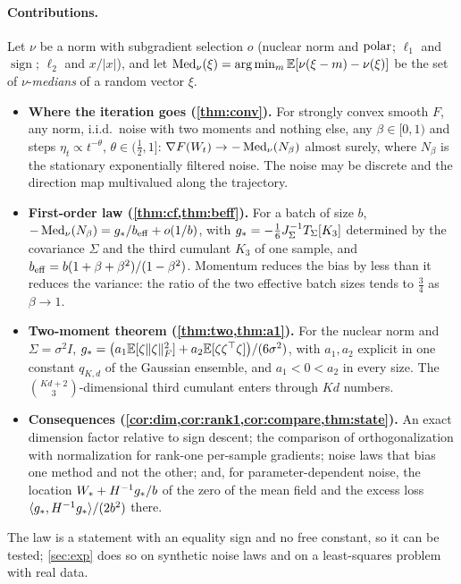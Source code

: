 \documentclass{article}
\theoremstyle{plain}
\theoremstyle{definition}
\theoremstyle{remark}
\begin{document}
\paragraph{Contributions.} Let $\nu$ be a norm with subgradient selection $o$ (nuclear norm and $\operatorname{polar}$; $\ell_1$ and
$\operatorname{sign}$; $\ell_2$ and $x/|x|$), and let $\operatorname{Med}_\nu(\xi)=\arg\min_m\mathbb{E}[\nu(\xi-m)-\nu(\xi)]$ be the set of
$\nu$-\emph{medians} of a random vector $\xi$.
\begin{itemize}\setlength\itemsep{1pt}
\item \textbf{Where the iteration goes (\cref{thm:conv}).} For strongly convex smooth $F$, any norm, i.i.d.\ noise with
two moments and nothing else, any $\beta\in[0,1)$ and steps $\eta_t\propto t^{-\theta}$, $\theta\in(\frac12,1]$:
$\nabla F(W_t)\to-\operatorname{Med}_\nu(N_\beta)$ almost surely, where $N_\beta$ is the stationary exponentially filtered noise.
The noise may be discrete and the direction map multivalued along the trajectory.
\item \textbf{First-order law (\cref{thm:cf,thm:beff}).} For a batch of size $b$,
$-\operatorname{Med}_\nu(N_\beta)=g_\ast/b_{\mathrm{eff}}+o(1/b)$, with $g_\ast=-\frac16J_\Sigma^{-1}T_\Sigma[K_3]$ determined by the covariance $\Sigma$
and the third cumulant $K_3$ of one sample, and $b_{\mathrm{eff}}=b(1+\beta+\beta^2)/(1-\beta^2)$. Momentum reduces the bias by
less than it reduces the variance: the ratio of the two effective batch sizes tends to $\frac34$ as $\beta\to1$.
\item \textbf{Two-moment theorem (\cref{thm:two,thm:a1}).} For the nuclear norm and $\Sigma=\sigma^2I$,
$g_\ast=\big(a_1\mathbb{E}[\zeta\|\zeta\|_{F}^2]+a_2\mathbb{E}[\zeta\zeta^\top\zeta]\big)/(6\sigma^2)$,
with $a_1,a_2$ explicit in one constant $q_{K,d}$ of the Gaussian ensemble, and $a_1<0<a_2$ in every size. The
$\binom{Kd+2}{3}$-dimensional third cumulant enters through $Kd$ numbers.
\item \textbf{Consequences (\cref{cor:dim,cor:rank1,cor:compare,thm:state}).} An exact dimension factor relative to sign
descent; the comparison of orthogonalization with normalization for rank-one per-sample gradients; noise laws that
bias one method and not the other; and, for parameter-dependent noise, the location $W_\ast+H^{-1}g_\ast/b$ of the zero
of the mean field and the excess loss $\langle g_\ast, H^{-1}g_\ast\rangle/(2b^2)$ there.
\end{itemize}
The law is a statement with an equality sign and no free constant, so it can be tested; \cref{sec:exp} does so on
synthetic noise laws and on a least-squares problem with real data.
\end{document}
